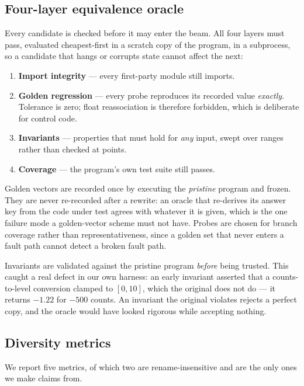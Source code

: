 \documentclass[10pt,twocolumn]{article}
\begin{document}
\subsection{Four-layer equivalence oracle}

Every candidate is checked before it may enter the beam. All four layers must
pass, evaluated cheapest-first in a scratch copy of the program, in a
subprocess, so a candidate that hangs or corrupts state cannot affect the next:

\begin{enumerate}
\item \textbf{Import integrity} --- every first-party module still imports.
\item \textbf{Golden regression} --- every probe reproduces its recorded value
      \emph{exactly}. Tolerance is zero; float reassociation is therefore
      forbidden, which is deliberate for control code.
\item \textbf{Invariants} --- properties that must hold for \emph{any} input,
      swept over ranges rather than checked at points.
\item \textbf{Coverage} --- the program's own test suite still passes.
\end{enumerate}

Golden vectors are recorded once by executing the \emph{pristine} program and
frozen. They are never re-recorded after a rewrite: an oracle that re-derives
its answer key from the code under test agrees with whatever it is given, which
is the one failure mode a golden-vector scheme must not have. Probes are chosen
for branch coverage rather than representativeness, since a golden set that
never enters a fault path cannot detect a broken fault path.

Invariants are validated against the pristine program \emph{before} being
trusted. This caught a real defect in our own harness: an early invariant
asserted that a counts-to-level conversion clamped to $[0, 10]$, which the
original does not do --- it returns $-1.22$ for $-500$ counts. An invariant the
original violates rejects a perfect copy, and the oracle would have looked
rigorous while accepting nothing.

\subsection{Diversity metrics}

We report five metrics, of which two are rename-insensitive and are the only
ones we make claims from.
\end{document}
